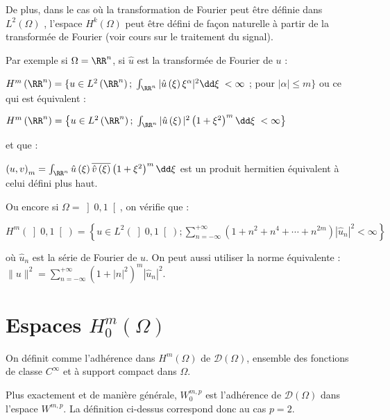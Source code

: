 \medskip
{}

\medskip{}
De plus, dans le cas où la transformation de Fourier peut être définie dans $L^{2} \left( \Omega \right)$ ,
l'espace $H^k(\Omega)$ peut être défini de façon naturelle à partir de la transformée de Fourier
(voir cours sur le traitement du signal).

Par exemple si $\Omega = \RR^{n}$, si $\widehat{u}$ est la transformée de Fourier de $u$ :

$H^{m}\left( \RR ^{n}\right)=\lbrace u \in L^{2}\left( \RR^{n}\right);\; \int_{\RR^{n}}\vert\hat{u}\left( \xi\right) \xi^{\alpha}\vert ^{2}\dd\xi \;<\infty\ $; pour\; $\vert\alpha\vert \leqslant m \rbrace$
ou ce qui est équivalent :

$H^{m}\left( \RR ^{n}\right)=\left\lbrace u \in L^{2}\left( \RR^{n}\right);\; \int_{\RR^{n}}\vert\hat{u}\left( \xi\right) \vert ^{2}\left( 1+\xi^{2}\right)^{m} \dd\xi \;<\infty \right\rbrace$

et que :

$\left( u,v \right)_{m}=\int_{\RR^{n}}\hat{u}\left(\xi \right) \overline{\hat{v}\left(\xi \right)} \left(1 + \xi^{2} \right) ^{m} \dd\xi$ est un produit hermitien équivalent à celui défini plus haut.

Ou encore si $\Omega =\left]0,1\right[$, on vérifie que :

$H^m(\left]0,1\right[) = \left\{ u\in L^2(\left]0,1\right[);\sum\limits_{n=-\infty}^{+\infty} (1+n^2 + n^4 + \dotsb + n^{2m}) |\widehat{u}_n|^2 < \infty \right\}$

où $\widehat{u}_n$ est la série de Fourier de $u$.
On peut aussi utiliser la norme équivalente : $\|u\|^2=\sum\limits_{n=-\infty}^{+\infty} (1 + |n|^{2})^m |\widehat{u}_n|^2$.




\medskip
\section{Espaces $H^m_0(\Omega)$}

\begin{definition}
On définit  comme l'adhérence dans $H^m(\Omega)$
de $\mathcal{D}(\Omega)$, ensemble des fonctions de classe $C^\infty$  et à support compact
dans $\Omega$.
\end{definition}
Plus exactement et de manière générale, $W^{m,p}_0$ est l'adhérence de $\mathcal{D}(\Omega)$ dans l'espace
$W^{m,p}$. La définition ci-dessus correspond donc au cas $p=2$.

